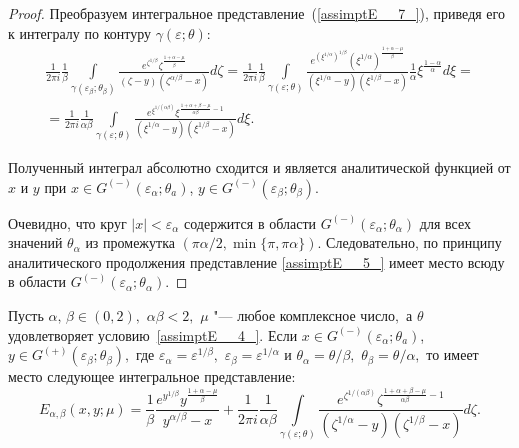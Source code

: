 \begin{proof}
Преобразуем интегральное представление~(\ref{assimptE__7_}), приведя его к
интегралу по контуру $\gamma (\varepsilon; \theta)$:
\begin{multline*}
\frac{1}{2\pi i} \frac{1}{\beta } \!\!\! \int\limits_{\gamma (\varepsilon_\beta; \theta_\beta ) } \!\!\! \frac{e^{\zeta ^{1/\beta}} \zeta ^{\frac{1+\alpha -\mu }{\beta } } }{\left(\zeta -y\right)\left(\zeta^{\alpha /\beta}  -x\right)} d\zeta  = 
\frac{1}{2\pi i} \frac{1}{\beta } \!\!\! \int\limits_{\gamma (\varepsilon; \theta)} \!\!\! \frac{e^{\left(\xi ^{1/ \alpha}  \right)^{1/\beta} } \left(\xi ^{1/ \alpha}  \right)^{\frac{1+\alpha -\mu }{\beta } } }{\left(\xi ^{1/ \alpha}  -y\right)\left(\xi ^{1/\beta} -x\right)}  \frac{1}{\alpha } \xi ^{\frac{1-\alpha }{\alpha } } d\xi =
\\
=\frac{1}{2\pi i} \frac{1}{\alpha \beta } \int\limits_{\gamma (\varepsilon; \theta)}\frac{e^{\xi^{1/(\alpha \beta)}  } \xi ^{\frac{1+\alpha +\beta -\mu }{\alpha \beta } -1} }{\left(\xi ^{1/ \alpha}  -y\right)\left(\xi ^{1/\beta} -x\right)}  d\xi .
\end{multline*}
%

Полученный интеграл абсолютно сходится и является аналитической функцией от $x$ и $y$ при $x\in G^{(-)} (\varepsilon_\alpha; \theta_a)$, $y\in G^{(-)} (\varepsilon _\beta  ;\theta _\beta )$.

Очевидно, что круг $|x|<\varepsilon _{\alpha }$ содержится в области $G^{(-)} (\varepsilon_\alpha; \theta_\alpha) $
для всех значений $\theta_\alpha$ из промежутка $\left(\pi \alpha/ 2 , \min \{\pi, \pi \alpha \}\right)$.
Следовательно, по принципу аналитического продолжения представление \eqref{assimptE__5_} имеет
место всюду в области $G^{(-)} (\varepsilon_\alpha; \theta_\alpha) $.
\end{proof}

\smallskip


\begin{lemma}[2]
Пусть $\alpha,\,\beta \in (0, 2),$ $\alpha \beta <2,$ $\mu$ "---
любое комплексное число$,$ а $\theta$ удовлетворяет условию~\eqref{assimptE__4_}$.$
Если $x\in G^{(-)} (\varepsilon_\alpha; \theta_a)$,
$y\in G^{(+)} (\varepsilon _\beta  ;\theta _\beta ),$
где $\varepsilon _{\alpha } =\varepsilon ^{1/\beta} ,$
$\varepsilon _{\beta } =\varepsilon ^{1/ \alpha} $
и $\theta _{\alpha } =\theta/ \beta ,$
$\theta _{\beta } =\theta/ \alpha ,$ то имеет место следующее интегральное
представление:
\begin{equation}
\label{assimptE__9_}
E_{\alpha ,\beta }  (x, y; \mu)=\frac{1}{\beta } \frac{e^{y^{1/\beta} } y^{\frac{1+\alpha -\mu }{\beta } } }{y^{\alpha/\beta}  -x} +\frac{1}{2\pi i} \frac{1}{\alpha \beta } \int\limits_{\gamma (\varepsilon; \theta)}\frac{e^{\zeta ^{1/(\alpha \beta)} }   \zeta ^{\frac{1+\alpha +\beta -\mu }{\alpha \beta } -1} }{\left(\zeta ^{1/ \alpha}  -y\right)\left(\zeta ^{1/\beta} -x\right)} d \zeta.
\end{equation}
\end{lemma}


